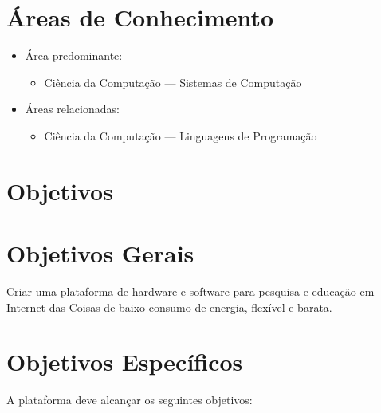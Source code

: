 \documentclass[titlepage,12pt]{article}
\begin{document}

\section{Áreas de Conhecimento}

\begin{itemize}
\item Área predominante:
    \begin{itemize}
    \item Ciência da Computação --- Sistemas de Computação     
    \end{itemize}
\item Áreas relacionadas:
    \begin{itemize}
    \item Ciência da Computação --- Linguagens de Programação
    \end{itemize}
\end{itemize}


\section{ Objetivos }

\section{ Objetivos Gerais }

Criar uma plataforma de hardware e software para pesquisa e educação em
Internet das Coisas de baixo consumo de energia, flexível e barata.

\section{ Objetivos Específicos }

A plataforma deve alcançar os seguintes objetivos:
\end{document}
